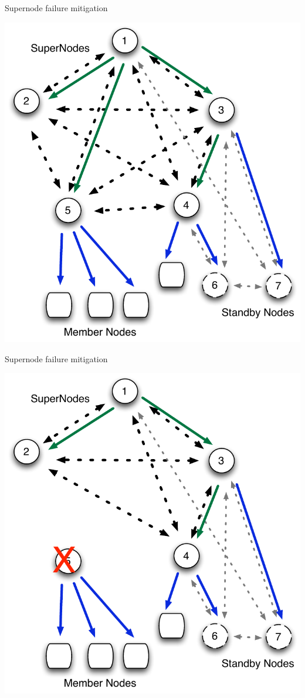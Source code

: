 \documentclass{beamer}
\begin{document}
\begin{frame}{Supernode failure mitigation}

\includegraphics[scale=.5]{Node-comm-v3.pdf}


\end{frame}



\begin{frame}{Supernode failure mitigation}

\includegraphics[scale=.5]{Node-comm-trans1.pdf}


\end{frame}
\end{document}
